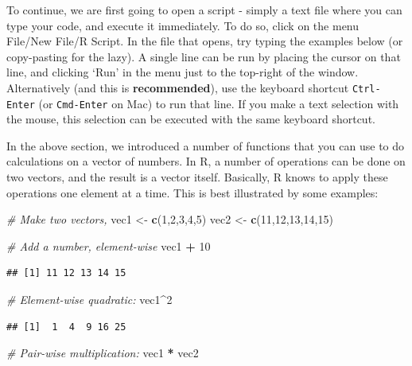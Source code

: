 \documentclass[]{book}
\newenvironment{Shaded}{\begin{snugshade}}{\end{snugshade}}
\newcommand{\CommentTok}[1]{\textcolor[rgb]{0.56,0.35,0.01}{\textit{#1}}}
\newcommand{\DecValTok}[1]{\textcolor[rgb]{0.00,0.00,0.81}{#1}}
\newcommand{\KeywordTok}[1]{\textcolor[rgb]{0.13,0.29,0.53}{\textbf{#1}}}
\newcommand{\NormalTok}[1]{#1}
\newcommand{\OperatorTok}[1]{\textcolor[rgb]{0.81,0.36,0.00}{\textbf{#1}}}
\newcommand{\StringTok}[1]{\textcolor[rgb]{0.31,0.60,0.02}{#1}}
\begin{document}
To continue, we are first going to open a script - simply a text file where you can type your code, and execute it immediately. To do so, click on the menu File/New File/R Script. In the file that opens, try typing the examples below (or copy-pasting for the lazy). A single line can be run by placing the cursor on that line, and clicking `Run' in the menu just to the top-right of the window. Alternatively (and this is \textbf{recommended}), use the keyboard shortcut \texttt{Ctrl-Enter} (or \texttt{Cmd-Enter} on Mac) to run that line. If you make a text selection with the mouse, this selection can be executed with the same keyboard shortcut.

In the above section, we introduced a number of functions that you can use to do calculations on a vector of numbers. In R, a number of operations can be done on two vectors, and the result is a vector itself. Basically, R knows to apply these operations one element at a time. This is best illustrated by some examples:

\begin{Shaded}
\begin{Highlighting}[]
\CommentTok{# Make two vectors,}
\NormalTok{vec1 <-}\StringTok{ }\KeywordTok{c}\NormalTok{(}\DecValTok{1}\NormalTok{,}\DecValTok{2}\NormalTok{,}\DecValTok{3}\NormalTok{,}\DecValTok{4}\NormalTok{,}\DecValTok{5}\NormalTok{)}
\NormalTok{vec2 <-}\StringTok{ }\KeywordTok{c}\NormalTok{(}\DecValTok{11}\NormalTok{,}\DecValTok{12}\NormalTok{,}\DecValTok{13}\NormalTok{,}\DecValTok{14}\NormalTok{,}\DecValTok{15}\NormalTok{)}

\CommentTok{# Add a number, element-wise}
\NormalTok{vec1 }\OperatorTok{+}\StringTok{ }\DecValTok{10}
\end{Highlighting}
\end{Shaded}

\begin{verbatim}
## [1] 11 12 13 14 15
\end{verbatim}

\begin{Shaded}
\begin{Highlighting}[]
\CommentTok{# Element-wise quadratic:}
\NormalTok{vec1}\OperatorTok{^}\DecValTok{2}
\end{Highlighting}
\end{Shaded}

\begin{verbatim}
## [1]  1  4  9 16 25
\end{verbatim}

\begin{Shaded}
\begin{Highlighting}[]
\CommentTok{# Pair-wise multiplication:}
\NormalTok{vec1 }\OperatorTok{*}\StringTok{ }\NormalTok{vec2}
\end{Highlighting}
\end{Shaded}
\end{document}
